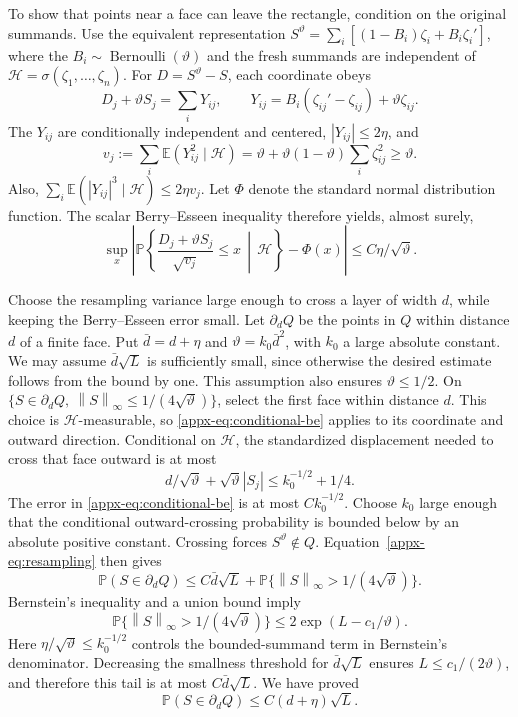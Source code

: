 \documentclass[11pt,letterpaper]{article}
\newif\ifshowrev
\newcommand{\rs}[1]{\ifshowrev{\color{revblue}#1}\else#1\fi}
\theoremstyle{remark}
\newcommand{\E}{\mathbb E}
\newcommand{\Pp}{\mathbb P}
\newcommand{\norm}[1]{\left\lVert#1\right\rVert}
\begin{document}
To show that points near a face can leave the rectangle, condition on
the original \rs{summands}. Use the equivalent representation
\(S^{\rs\vartheta}=\sum_i[(1-B_i)\zeta_i+B_i\zeta_i']\), where the
\(B_i\sim\operatorname{Bernoulli}(\rs\vartheta)\) and the fresh \rs{summands} are
independent of \(\rs{\mathcal H}=\sigma(\zeta_1,\ldots,\zeta_n)\).
For \(D=S^{\rs\vartheta}-S\), each coordinate obeys
\[
 D_j+\rs\vartheta S_j=\sum_iY_{ij},\qquad
 Y_{ij}=B_i(\zeta_{ij}'-\zeta_{ij})+\rs\vartheta\zeta_{ij}.
\]
The \(Y_{ij}\) are conditionally independent and centered,
\(|Y_{ij}|\le2\eta\), and
\[
 v_j:=\sum_i\E(Y_{ij}^2\mid\rs{\mathcal H})
 =\rs\vartheta+\rs\vartheta(1-\rs\vartheta)\sum_i\zeta_{ij}^2\ge\rs\vartheta.
\]
Also, \(\sum_i\E(|Y_{ij}|^3\mid\rs{\mathcal H})\le2\eta v_j\).
Let \(\Phi\) denote the standard normal distribution function.
The scalar Berry--Esseen inequality therefore yields, almost surely,
\begin{equation}
 \sup_x\left|
 \Pp\left\{\frac{D_j+\rs\vartheta S_j}{\sqrt{v_j}}\le x
 \,\middle|\,\rs{\mathcal H}\right\}-\Phi(x)\right|
 \le C\eta/\sqrt{\rs\vartheta}.
 \label{appx-eq:conditional-be}
\end{equation}

Choose the resampling variance large enough to cross a layer of width
\(d\), while keeping the Berry--Esseen error small. Let \(\partial_d Q\)
be the points in \(Q\) within distance \(d\) of a finite face. Put
\(\rs{\bar d}=d+\eta\) and \(\rs\vartheta=\rs{k_0}\rs{\bar d}^2\), with \(\rs{k_0}\) a large absolute
constant. We may assume \(\rs{\bar d}\sqrt L\) is sufficiently small, since
otherwise the desired estimate follows from the bound by one. This
assumption also ensures \(\rs\vartheta\le1/2\).
On
\(\{S\in\partial_d Q,\ \norm S_\infty\le1/(4\sqrt{\rs\vartheta})\}\),
select the first face within distance \(d\). This choice is
\(\rs{\mathcal H}\)-measurable, so \eqref{appx-eq:conditional-be} applies to
its coordinate and outward direction. Conditional on \(\rs{\mathcal H}\), the standardized displacement needed to cross that
face outward is at most
\[
 d/\sqrt{\rs\vartheta}+\sqrt{\rs\vartheta}|S_j|
 \le\rs{k_0}^{-1/2}+1/4.
\]
The error in \eqref{appx-eq:conditional-be} is at most \(C\rs{k_0}^{-1/2}\).
Choose \(\rs{k_0}\) large enough that the conditional outward-crossing
probability is bounded below by an absolute positive constant.
Crossing forces \(S^{\rs\vartheta}\notin Q\). Equation~\eqref{appx-eq:resampling}
then gives
\[
 \Pp(S\in\partial_d Q)
 \le C\rs{\bar d}\sqrt L
 +\Pp\{\norm S_\infty>1/(4\sqrt{\rs\vartheta})\}.
\]
Bernstein's inequality and a union bound imply
\[
 \Pp\{\norm S_\infty>1/(4\sqrt{\rs\vartheta})\}
 \le2\exp(L-c_1/\rs\vartheta).
\]
Here \(\eta/\sqrt{\rs\vartheta}\le\rs{k_0}^{-1/2}\) controls the bounded-summand
term in Bernstein's denominator. Decreasing the smallness threshold for
\(\rs{\bar d}\sqrt L\) ensures \(L\le c_1/(2\rs\vartheta)\), and therefore this
tail is at most \(C\rs{\bar d}\sqrt L\). We have proved
\begin{equation}
 \Pp(S\in\partial_d Q)\le C(d+\eta)\sqrt L.
 \label{appx-eq:inner-layer}
\end{equation}
\end{document}

